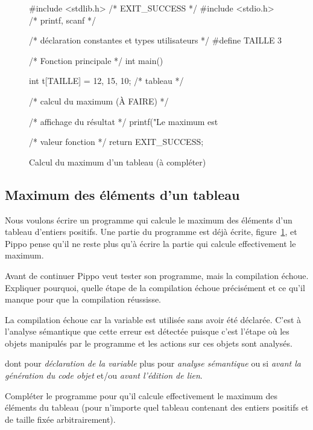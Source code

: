 \begin{figure}[htb]
\begin{small}
\begin{listing}{1}
#include <stdlib.h> /* EXIT_SUCCESS */
#include <stdio.h> /* printf, scanf */

/* déclaration constantes et types utilisateurs */
#define TAILLE 3

/* Fonction principale */
int main()
{
  int t[TAILLE] = {12, 15, 10}; /* tableau */



  /* calcul du maximum (À FAIRE) */





  /* affichage du résultat */
  printf("Le maximum est %

  /* valeur fonction */
  return EXIT_SUCCESS;
}
\end{listing}
\end{small}
  \caption{Calcul du maximum d'un tableau (à compléter)}
  \label{fig:max}
\end{figure}

\subsection{Maximum des éléments d'un tableau}

Nous voulons écrire un programme qui calcule le maximum des éléments
d'un tableau d'entiers positifs. Une partie du programme est déjà écrite, figure~\ref{fig:max}, et
Pippo pense qu'il ne
reste plus qu'à écrire la partie qui calcule effectivement le
maximum. 

\question Avant de continuer Pippo veut tester son programme, mais la compilation échoue. Expliquer pourquoi, quelle étape de la
  compilation échoue précisément et ce qu'il manque pour que la
  compilation réussisse. 

  \begin{correction}

La compilation échoue car la variable  est utilisée sans
avoir été déclarée. C'est à l'analyse sémantique que cette erreur est
détectée puisque c'est l'étape où les objets manipulés par le
programme et les actions sur ces objets sont analysés.  
    \begin{baremeenv}
       dont  pour \emph{déclaration de la variable
      }  plus  pour \emph{analyse sémantique} ou
       si \emph{avant la génération du code objet} et/ou \emph{avant
      l'édition de lien}.
    \end{baremeenv}
  \end{correction}
\question Compléter le programme pour qu'il calcule effectivement le maximum
  des éléments du tableau (pour n'importe quel tableau contenant des
  entiers positifs et de taille  fixée arbitrairement). 

